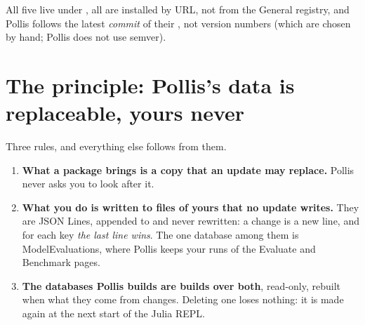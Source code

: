All five live under , all are installed by URL, not from the General registry, and
Pollis follows the latest \emph{commit} of their , not version numbers (which are chosen by hand; Pollis
does not use semver).

\section{The principle: Pollis's data is replaceable, yours never}\label{sec:principle}

Three rules, and everything else follows from them.
\begin{enumerate}
  \item \textbf{What a package brings is a copy that an update may replace.} Pollis never asks you to look after it.
  \item \textbf{What you do is written to files of yours that no update writes.} They are JSON Lines, appended to and
    never rewritten: a change is a new line, and for each key \emph{the last line wins}. The one database among them is
    ModelEvaluations, where Pollis keeps your runs of the Evaluate and Benchmark pages.
  \item \textbf{The databases Pollis builds are builds over both}, read-only, rebuilt when what they come from
    changes. Deleting one loses nothing: it is made again at the next start of the Julia REPL.
\end{enumerate}

